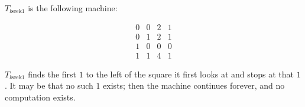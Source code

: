 $T_{l\text{seek}1}$ is the following machine:

$$\begin{array}{cccc}
0 & 0 & 2 & 1 \\
0 & 1 & 2 & 1 \\
1 & 0 & 0 & 0 \\
1 & 1 & 4 & 1
\end{array}$$

$T_{l\text{seek}1}$ finds the first $1$ to the left of the square it first looks at and stops at that $1$. It may be that no such $1$ exists; then the machine continues forever, and no computation exists.
